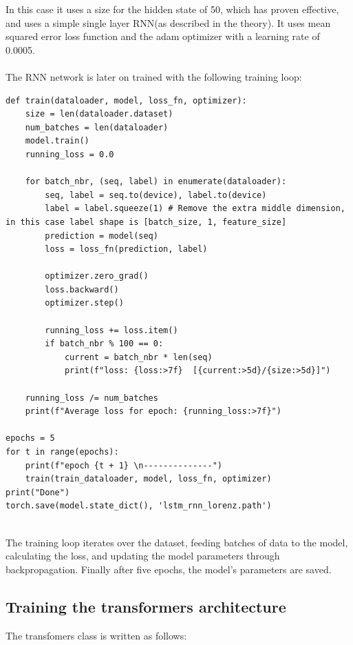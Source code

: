 \documentclass[11pt]{article}
\begin{document}
In this case it uses a size for the hidden state of 50, which has proven effective, and uses a simple single layer RNN(as described in the theory). It uses mean squared error loss function and the adam optimizer with a learning rate of 0.0005. \\ \\  The RNN network is later on trained with the following training loop:

\begin{lstlisting}
def train(dataloader, model, loss_fn, optimizer):
    size = len(dataloader.dataset)
    num_batches = len(dataloader)
    model.train()
    running_loss = 0.0

    for batch_nbr, (seq, label) in enumerate(dataloader):
        seq, label = seq.to(device), label.to(device)
        label = label.squeeze(1) # Remove the extra middle dimension, in this case label shape is [batch_size, 1, feature_size]
        prediction = model(seq)
        loss = loss_fn(prediction, label)

        optimizer.zero_grad()
        loss.backward()
        optimizer.step()

        running_loss += loss.item()
        if batch_nbr % 100 == 0:
            current = batch_nbr * len(seq)
            print(f"loss: {loss:>7f}  [{current:>5d}/{size:>5d}]")

    running_loss /= num_batches
    print(f"Average loss for epoch: {running_loss:>7f}")

epochs = 5
for t in range(epochs):
    print(f"epoch {t + 1} \n--------------")
    train(train_dataloader, model, loss_fn, optimizer)
print("Done")
torch.save(model.state_dict(), 'lstm_rnn_lorenz.path')
    
\end{lstlisting}
The training loop iterates over the dataset, feeding batches of data to the model, calculating the loss, and updating the model parameters through backpropagation. Finally after five epochs, the model's parameters are saved.

\subsection{Training the transformers architecture}

The transfomers class is written as follows:
\end{document}
